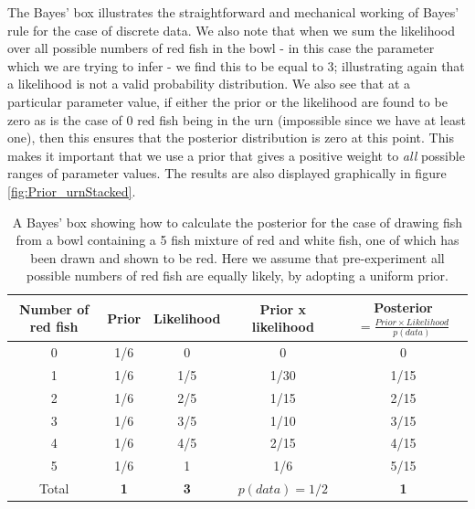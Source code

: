 \documentclass[11pt,fullpage]{book}
\begin{document}
The Bayes' box illustrates the straightforward and mechanical working of Bayes' rule for the case of discrete data. We also note that when we sum the likelihood over all possible numbers of red fish in the bowl - in this case the parameter which we are trying to infer - we find this to be equal to 3; illustrating again that a likelihood is not a valid probability distribution. We also see that at a particular parameter value, if either the prior or the likelihood are found to be zero as is the case of 0 red fish being in the urn (impossible since we have at least one), then this ensures that the posterior distribution is zero at this point. This makes it important that we use a prior that gives a positive weight to \textit{all} possible ranges of parameter values. The results are also displayed graphically in figure \ref{fig:Prior_urnStacked}.

\begin{table}[htbp]
  \centering
  \caption{A Bayes' box showing how to calculate the posterior for the case of drawing fish from a bowl containing a 5 fish mixture of red and white fish, one of which has been drawn and shown to be red. Here we assume that pre-experiment all possible numbers of red fish are equally likely, by adopting a uniform prior.}\label{tab:Prior_bayesBoxDiscreteUrns}
    \begin{tabular}{ccccc}
    \toprule
    \textbf{Number of red fish} & \textbf{Prior} & \textbf{Likelihood} & \textbf{Prior x likelihood} & \textbf{Posterior$=\frac{Prior\times Likelihood}{p(data)}$} \\
    \midrule
    0     &  1/6  & 0     & 0       & 0       \\
    1     &  1/6  &  1/5  &   1/30 &   1/15 \\
    2     &  1/6  &  2/5  &   1/15 &   2/15 \\
    3     &  1/6  &  3/5  &   1/10 &   3/15  \\
    4     &  1/6  &  4/5  &   2/15 &   4/15 \\
    5     &  1/6  & 1     &   1/6  &   5/15  \\
    \bottomrule
    Total & \textbf{1    } & \textbf{3    } & \textbf{$p(data)=1/2$ } & \textbf{1      } \\
    \bottomrule
    \end{tabular}%
  \label{tab:addlabel}%
\end{table}%
\end{document}

